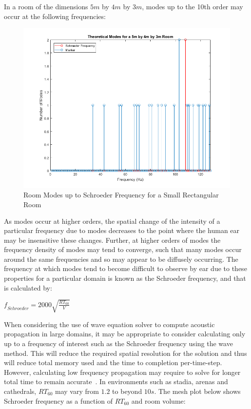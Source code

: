 In a room of the dimensions $5m$ by $4m$ by $3m$, modes up to the 10th order may occur at the following frequencies:\\

\begin{figure}[H]
\centering
  \includegraphics[width=\textwidth]{./graphics/modesuptoschr.png}
  \caption{Room Modes up to Schroeder Frequency for a Small Rectangular Room}
\end{figure}

As modes occur at higher orders, the spatial change of the intensity of a particular frequency due to modes decreases to the point where the human ear may be insensitive these changes. Further, at higher orders of modes the frequency density of modes may tend to converge, such that many modes occur around the same frequencies and so may appear to be diffusely occurring. The frequency at which modes tend to become difficult to observe by ear due to these properties for a particular domain is known as the Schroeder frequency, and that is calculated by:\\

\begin{center}
$ \textit{f}_{Schroeder} = 2000 \sqrt{\frac{RT_{60}}{V}} $\\
\end{center}

When considering the use of wave equation solver to compute acoustic propagation in large domains, it may be appropriate to consider calculating only up to a frequency of interest such as the Schroeder frequency using the wave method. This will reduce the required spatial resolution for the solution and thus will reduce total memory used and the time to completion per-time-step. However, calculating low frequency propagation may require to solve for longer total time to remain accurate~\cite{Bilbao2004a}. In environments such as stadia, arenas and cathedrals, $RT_{60}$ may vary from $1.2$ to beyond $10s$. The mesh plot below shows Schroeder frequency as a function of $RT_{60}$ and room volume: \\

